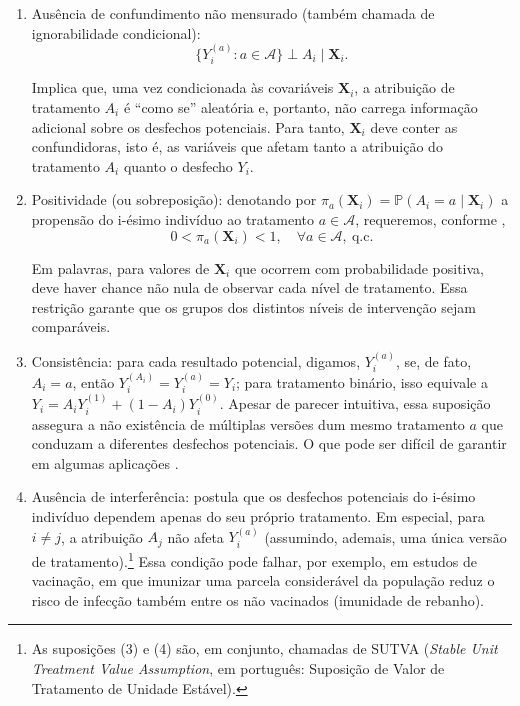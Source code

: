 \begin{enumerate}
    \item Ausência de confundimento não mensurado (também chamada de ignorabilidade condicional):
	\[
            \{Y_i^{(a)}: a \in \mathcal{A}\} \perp A_i \mid \mathbf{X}_i.
    \]
    
    Implica que, uma vez condicionada às covariáveis \(\mathbf{X}_i\), a atribuição de tratamento \(A_i\) é ``como se'' aleatória e, portanto, não carrega informação adicional sobre os desfechos potenciais. 
    Para tanto, \(\mathbf{X}_i\) deve conter as confundidoras, isto é, as variáveis que afetam tanto a atribuição do tratamento \(A_i\) quanto o desfecho \(Y_i\).

    \item Positividade (ou sobreposição): denotando por \(\pi_a(\mathbf{X}_i) = \mathbb{P}(A_i = a \mid \mathbf{X}_i)\) a propensão do i-ésimo indivíduo ao tratamento \(a \in \mathcal{A}\), requeremos, conforme , 
		\[
            0 < \pi_a(\mathbf{X}_i) < 1, \quad \forall a \in \mathcal{A}, \ \text{q.c.}
        \]

    Em palavras, para valores de \(\mathbf{X}_i\) que ocorrem com probabilidade positiva, deve haver chance não nula de observar cada nível de tratamento. 
    Essa restrição garante que os grupos dos distintos níveis de intervenção sejam comparáveis.

    \item Consistência: para cada resultado potencial, digamos, \(Y_i^{(a)}\), se, de fato, \(A_i = a\), então \(Y_i^{(A_i)} = Y_i^{(a)} = Y_i\); para tratamento binário, isso equivale a \(Y_i = A_i Y_i^{(1)} + (1 - A_i) Y_i^{(0)}\). 
    Apesar de parecer intuitiva, essa suposição assegura a não existência de múltiplas versões dum mesmo tratamento \(a\) que conduzam a diferentes desfechos potenciais. 
    O que pode ser difícil de garantir em algumas aplicações \cite{hernan_causal_2023}.

    \item Ausência de interferência: postula que os desfechos potenciais do i-ésimo indivíduo dependem apenas do seu próprio tratamento. 
    Em especial, para \(i \neq j\), a atribuição \(A_j\) não afeta \(Y_i^{(a)}\) (assumindo, ademais, uma única versão de tratamento).\footnote{As suposições (3) e (4) são, em conjunto, chamadas de SUTVA (\emph{Stable Unit Treatment Value Assumption}, em português: Suposição de Valor de Tratamento de Unidade Estável).} Essa condição pode falhar, por exemplo, em estudos de vacinação, em que imunizar uma parcela considerável da população reduz o risco de infecção também entre os não vacinados (imunidade de rebanho).  
\end{enumerate}

